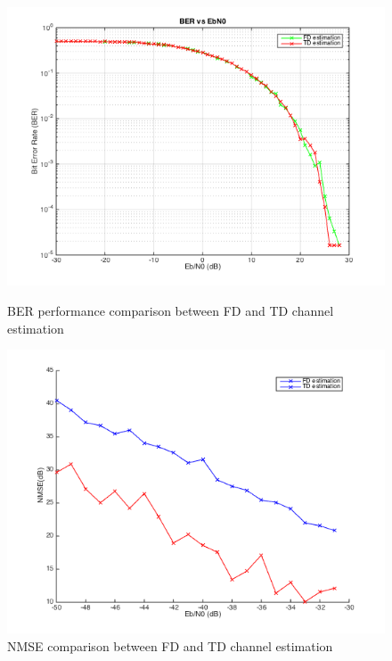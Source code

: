 \documentclass[a4paper]{article}
\begin{document}
     \begin{figure}[hbtp]
		\begin{minipage}[t]{0.5\linewidth}
			\centering
			\includegraphics[scale=0.5]{figures/fdvstd_ber.png}
			\vspace{-0.3cm}
			\centering
			\caption{BER performance comparison between FD and TD  channel estimation}
            \label{fig:BER_td}
		\end{minipage}
		\begin{minipage}[t]{0.5\linewidth}
			\centering
			\includegraphics[scale=0.5]{figures/tdvsfd.png}
			\vspace{-0.3cm}
			\centering
			\caption{NMSE comparison between FD and TD channel estimation}
               \label{fig:NMSE_td}
		\end{minipage}
	\end{figure}
    
\end{document}
